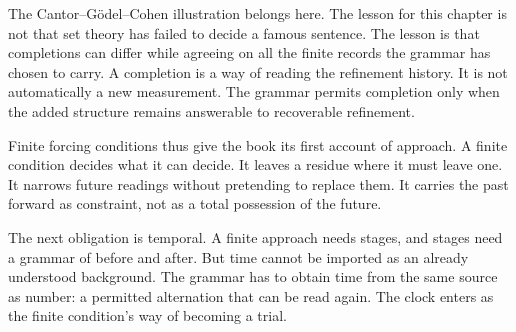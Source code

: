 The Cantor--G\"odel--Cohen illustration belongs here. The lesson for this
chapter is not that set theory has failed to decide a famous sentence.
The lesson is that completions can differ while agreeing on all the
finite records the grammar has chosen to carry. A completion is a way of
reading the refinement history. It is not automatically a new
measurement. The grammar permits completion only when the added
structure remains answerable to recoverable refinement.

Finite forcing conditions thus give the book its first account of
approach. A finite condition decides what it can decide. It leaves a
residue where it must leave one. It narrows future readings without
pretending to replace them. It carries the past forward as constraint,
not as a total possession of the future.

The next obligation is temporal. A finite approach needs stages, and
stages need a grammar of before and after. But time cannot be imported as
an already understood background. The grammar has to obtain time from
the same source as number: a permitted alternation that can be read
again. The clock enters as the finite condition's way of becoming a
trial.
